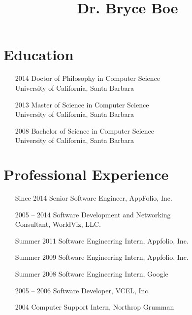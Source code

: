 \documentclass[10pt,letterpaper,oneside,twocolumn]{article}
\begin{document}
\setcounter{secnumdepth}{0}  %

\title{Dr. Bryce Boe}
\date{}
\maketitle


\section{Education}
\begin{itemize}
  \item [2014] Doctor of Philosophy in Computer Science\\ University of
    California, Santa Barbara
  \item [2013] Master of Science in Computer Science\\ University of
    California, Santa Barbara
  \item [2008] Bachelor of Science in Computer Science\\ University of
    California, Santa Barbara
\end{itemize}


\section{Professional Experience}
\begin{itemize}
  \item [Since 2014] Senior Software Engineer, AppFolio, Inc.
  \item [2005 -- 2014] Software Development and Networking\\ Consultant,
    WorldViz, LLC.
  \item [Summer 2011] Software Engineering Intern, Appfolio, Inc.
  \item [Summer 2009] Software Engineering Intern, Appfolio, Inc.
  \item [Summer 2008] Software Engineering Intern, Google
  \item [2005 -- 2006] Software Developer, VCEL, Inc.
  \item [2004] Computer Support Intern, Northrop Grumman
\end{itemize}
\end{document}
